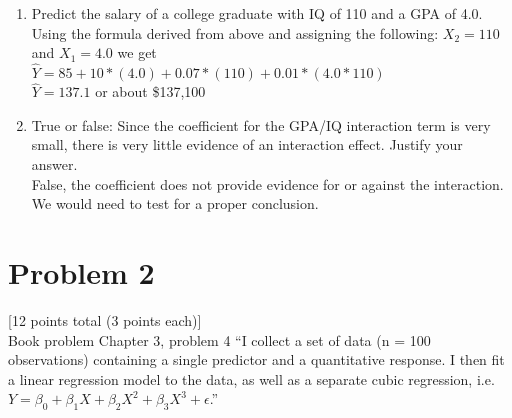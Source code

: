 \documentclass[12pt]{article}
\begin{document}
\begin{enumerate}
    \item Predict the salary of a college graduate with IQ of 110 and a GPA of 4.0.\\
          Using the formula derived from above and assigning the following: $X_2 = 110$ and $X_1 = 4.0$ we get\\
          $\hat{Y} = 85 + 10 * (4.0) + 0.07 * (110) + 0.01 * (4.0 * 110)$\\
          $\hat{Y} = 137.1$ or about \$137,100
    \item True or false: Since the coefficient for the GPA/IQ interaction term is very small, there is very little evidence of an interaction effect. Justify your answer.\\
          False, the coefficient does not provide evidence for or against the interaction. We would need to test for a proper conclusion.
\end{enumerate}


\pagebreak
\section*{Problem 2}
 [12 points total (3 points each)]\\
Book problem Chapter 3, problem 4 “I collect a set of data (n = 100 observations) containing a single predictor and a quantitative response. I then fit a linear regression model to the data, as well as a separate cubic regression, i.e. $Y = \beta_0 + \beta_1X + \beta_2X^2 + \beta_3X^3 + \epsilon$.”
\end{document}
